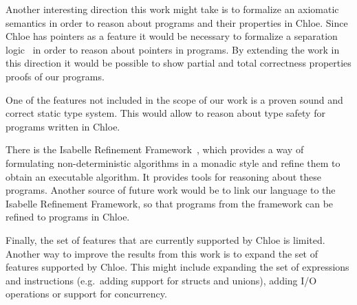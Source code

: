 Another interesting direction this work might take is to formalize an axiomatic semantics in order to reason about programs and their properties in Chloe.
Since Chloe has pointers as a feature it would be necessary to formalize a separation logic~\parencite{sep-logic} in order to reason about pointers in programs.
By extending the work in this direction it would be possible to show partial and total correctness properties proofs of our programs.

One of the features not included in the scope of our work is a proven sound and correct static type system.
This would allow to reason about type safety for programs written in Chloe.

There is the Isabelle Refinement Framework~\parencite{Refine_Monadic-AFP}, which provides a way of formulating non-deterministic algorithms in a monadic style and refine them to obtain an executable algorithm.
It provides tools for reasoning about these programs.
Another source of future work would be to link our language to the Isabelle Refinement Framework, so that programs from the framework can be refined to programs in Chloe.

Finally, the set of features that are currently supported by Chloe is limited.
Another way to improve the results from this work is to expand the set of features supported by Chloe.
This might include expanding the set of expressions and instructions (e.g.\ adding support for structs and unions), adding I/O operations or support for concurrency.
